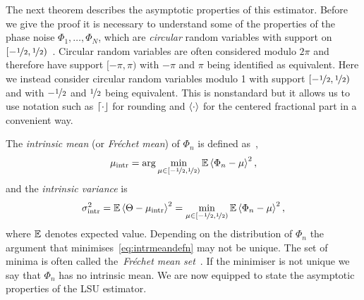 \documentclass[journal]{IEEEtran}
\begin{document}
The next theorem describes the asymptotic properties of this estimator.  Before we give the proof it is necessary to understand some of the properties of the phase noise $\Phi_1,\dots,\Phi_N$, which are \emph{circular} random variables with support on $[-\nicefrac{1}{2}, \nicefrac{1}{2})$~\cite{McKilliam2010thesis,McKilliam_mean_dir_est_sq_arc_length2010,Mardia_directional_statistics,Fisher1993}.  Circular random variables are often considered modulo $2\pi$ and therefore have support $[-\pi, \pi)$ with $-\pi$ and $\pi$ being identified as equivalent.  Here we instead consider circular random variables modulo 1 with support $[-\nicefrac{1}{2}, \nicefrac{1}{2})$ and with $-\nicefrac{1}{2}$ and $\nicefrac{1}{2}$ being equivalent.  This is nonstandard but it allows us to use notation such as ${\left\lceil \cdot \right\rfloor}$ for rounding and $\left\langle \cdot \right\rangle$ for the centered fractional part in a convenient way.   %

The \emph{intrinsic mean} (or \emph{Fr\'{e}chet mean}) of $\Phi_n$ is defined as~\cite{McKilliam_mean_dir_est_sq_arc_length2010,Bhattacharya_int_ext_means_2003},
\begin{equation}\label{eq:intrmeandefn}
 \mu_{\text{intr}}  = \arg \min_{\mu \in [-\nicefrac{1}{2}, \nicefrac{1}{2})} {\mathbb E} \left\langle \Phi_n - \mu \right\rangle^2, 
\end{equation}
and the \emph{intrinsic variance} is
\[
\sigma_{\text{intr}}^2 = {\mathbb E}\left\langle \Theta - \mu_{\text{intr}} \right\rangle^2 = \min_{\mu \in [-\nicefrac{1}{2}, \nicefrac{1}{2})} {\mathbb E} \left\langle \Phi_n - \mu \right\rangle^2,
\]
where ${\mathbb E}$ denotes expected value.  Depending on the distribution of $\Phi_n$ the argument that minimises~\eqref{eq:intrmeandefn} may not be unique.  The set of minima is often called the~\emph{Fr\'{e}chet mean set}~\cite{Bhattacharya_int_ext_means_2003,Bhattacharya_int_ext_means_2005}.  If the minimiser is not unique we say that $\Phi_n$ has no intrinsic mean.  We are now equipped to state the asymptotic properties of the LSU estimator.
\end{document}
